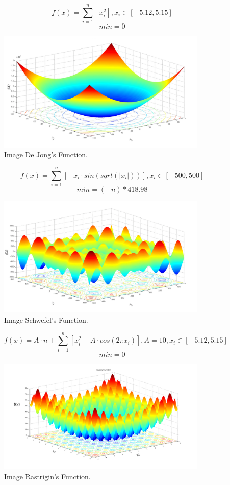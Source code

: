 \documentclass{report}
\begin{document}
\begin{figure}[!h]
  \centering
  $$ f(x) = \sum_{i=1}^n \left[ x_i^2 \right],
   x_i \in \left[ -5.12, 5.15 \right]$$
   $$min = 0$$

  \includegraphics[width=100mm,scale=0.5]{De_Jong_function}
  \caption{Image De Jong's Function.\protect\footnotemark}
\end{figure}

\pagebreak

\begin{figure}[!h]
  \centering
  $$ f(x) = \sum_{i=1}^n \left[-x_i \cdot sin(sqrt(|x_i|)) \right],
   x_i \in \left[ -500, 500 \right]$$
   $$min = (-n) * 418.98$$

  \includegraphics[width=100mm,scale=0.5]{Schwefel_fucntion}
  \caption{Image Schwefel's Function. \protect\footnotemark}
\end{figure}

\begin{figure}[!h]
  \centering
  $$ f(x) = A \cdot n + \sum_{i=1}^n \left[ x_i^2 - A \cdot cos(2 \pi x_i) \right],
  A = 10, x_i \in \left[ -5.12, 5.15 \right]$$
   $$min = 0$$

  \includegraphics[width=100mm,scale=0.5]{Rastrigin_function}
  \caption{Image Rastrigin's Function. \protect\footnotemark}
\end{figure}
\end{document}
